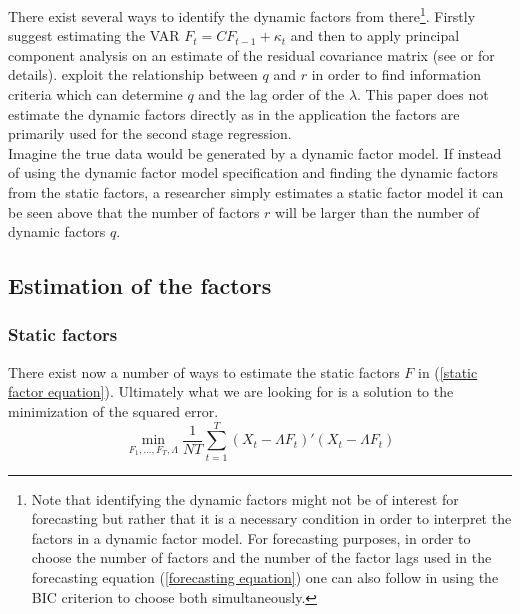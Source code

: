 \documentclass[12pt]{article}
\begin{document}
There exist several ways to identify the dynamic factors from there\footnote{Note that identifying the dynamic factors might not be of interest for forecasting but rather that it is a necessary condition in order to interpret the factors in a dynamic factor model. For forecasting purposes, in order to choose the number of factors and the number of the factor lags used in the forecasting equation (\ref{forecasting equation}) one can also follow \citet{bai2008forecasting} in using the BIC criterion to choose both simultaneously. }. Firstly \citet{giannone2002tracking} suggest estimating the VAR $F_t = C F_{t-1} + \kappa_t$ and then to apply principal component analysis on an estimate of the residual covariance matrix (see \citet{breitung2004identification} or \citet{giannone2002tracking} for details). \citet{breitung2004identification} exploit the relationship between $q$ and $r$ in order to find information criteria which can determine $q$ and the lag order of the $\lambda$. This paper does not estimate the dynamic factors directly as in the application the factors are primarily used for the second stage regression. \\

Imagine the true data would be generated by a dynamic factor model. If instead of using the dynamic factor model specification and finding the dynamic factors from the static factors, a researcher simply estimates a static factor model it can be seen above that the number of factors $r$ will be larger than the number of dynamic factors $q$.

\subsection{Estimation of the factors}
\subsubsection{Static factors}
There exist now a number of ways to estimate the static factors $F$ in (\ref{static factor equation}). Ultimately what we are looking for is a solution to the minimization of the squared error.
\begin{equation}
	\label{factor equation minimization problem}
	\min_{F_1, ..., F_T, \Lambda} \frac{1}{NT} \sum_{t=1}^T (X_t - \Lambda F_t)'(X_t - \Lambda F_t)
\end{equation}
\end{document}
